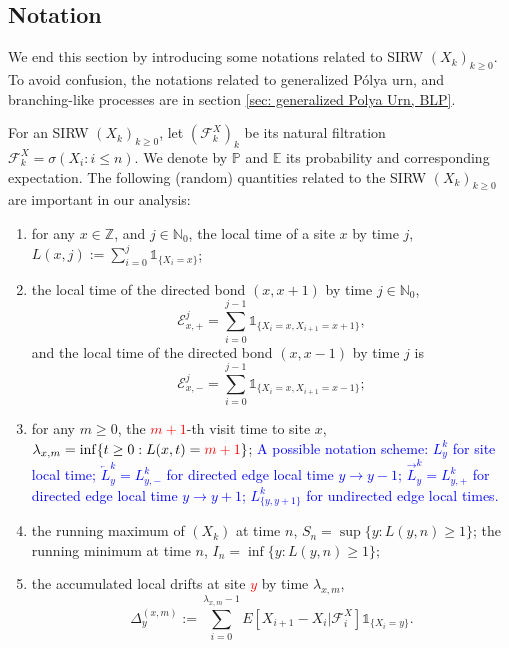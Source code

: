 \documentclass[twoside,12pt,a4paper]{article}
\numberwithin{equation}{section}
\newcommand{\edt}[1]{\textcolor{red}{#1}} %
\newcommand{\comment}[1]{\textcolor{blue}{#1}}
\begin{document}
	\subsection{Notation}
	We end this section by introducing some notations related to SIRW $(X_k)_{k\geq 0}$. To avoid confusion, the notations related to generalized P\'{o}lya urn, and branching-like processes are in section \ref{sec: generalized Polya Urn, BLP}.
	
	For an SIRW $(X_k)_{k\geq 0}$,  let $(\mathcal{F}^X_k)_k$ be its natural filtration $\mathcal{F}^X_k = \sigma\left(X_i: i\leq n \right).$ We denote by $\mathbb{P}$ and $\mathbb{E}$ its probability and corresponding expectation. The following (random) quantities related to the SIRW $(X_k)_{k\geq0}$ are important in our analysis:
	\begin{enumerate}
		\item for any $x \in \mathbb{Z}$, and $j\in \mathbb{N}_0$, the local time of a site $x$ by time $j$, $L(x,j):= \sum_{i=0}^j \mathbb{1}_{\{X_i=x\} }$; %
		
		\item the local time of the directed bond $(x,x+1)$ by time $j\in \mathbb{N}_0$,
		$$ \mathcal{E}^j_{x,+} = \sum_{i=0}^{j-1} \mathbb{1}_{\{X_i=x, X_{i+1} =x+1 \} } ,$$
		and the local time of the directed bond $(x,x-1)$ by time $j$ is 
		$$ \mathcal{E}^j_{x,-} = \sum_{i=0}^{j-1} \mathbb{1}_{\{X_i=x, X_{i+1} =x-1 \} }; $$
		
		
		\item for any $m\geq 0$, the \edt{$m+1$}-th visit time to site $x$, $\lambda_{x,m} = \inf\{t \geq 0: L(x,t) = \edt{m+1} \}$;
			\comment{A possible notation scheme: $L_y^k$ for site local time; $\overleftarrow{L}_y^k = L_{y, -}^k$ for directed edge local time $y \to y-1$; $\overrightarrow{L}_y^k = L_{y, +}^k$ for directed edge local time  $y \to y+1$; $L_{\{y, y+1\}}^k $ for undirected edge local times.}
		
		\item the running maximum of $(X_k)$ at time $n$, $S_n= \sup\{y: L(y,n)\geq 1 \} $; the running minimum at time $n$, $I_n= \inf\{y: L(y,n)\geq 1 \} $;
		
		\item 
		the accumulated local drifts at site \edt{$y$} by time $\lambda_{x,m}$, 
		\begin{equation}\label{eq: accumulated local drift}
			\Delta_y^{(x,m)}:= \sum_{i=0}^{\lambda_{x,m}-1} E[X_{i+1}-X_i\vert \mathcal{F}_{i}^X] \mathbb{1}_{\{X_i=y\}}.
		\end{equation}
	\end{enumerate}
	
\end{document}
